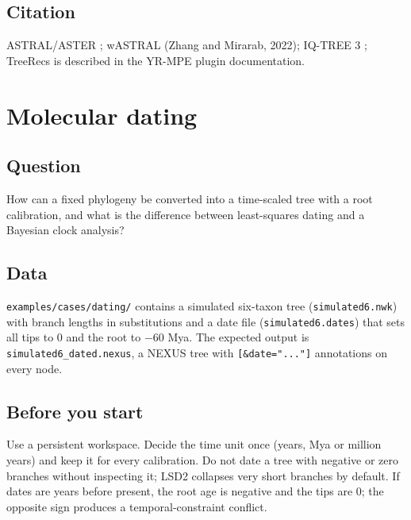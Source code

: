 \documentclass[11pt]{report}
\begin{document}
\section{Citation}
ASTRAL/ASTER \cite{astral}; wASTRAL (Zhang and Mirarab, 2022); IQ-TREE 3
\cite{iqtree3}; TreeRecs is described in the YR-MPE plugin documentation.

\chapter{Molecular dating}
\section{Question}
How can a fixed phylogeny be converted into a time-scaled tree with a root
calibration, and what is the difference between least-squares dating and a
Bayesian clock analysis?

\section{Data}
\texttt{examples/cases/dating/} contains a simulated six-taxon tree
(\texttt{simulated6.nwk}) with branch lengths in substitutions and a date
file (\texttt{simulated6.dates}) that sets all tips to 0 and the root to
$-60$ Mya. The expected output is \texttt{simulated6\_dated.nexus}, a NEXUS
tree with \texttt{[\&date="..."]} annotations on every node.

\section{Before you start}
Use a persistent workspace. Decide the time unit once (years, Mya or
million years) and keep it for every calibration. Do not date a tree with
negative or zero branches without inspecting it; LSD2 collapses very short
branches by default. If dates are years before present, the root age is
negative and the tips are 0; the opposite sign produces a temporal-constraint
conflict.
\end{document}
